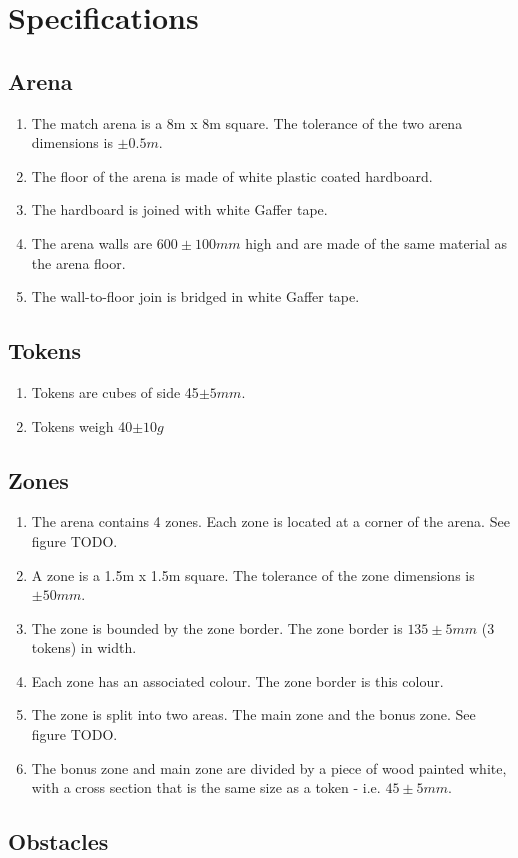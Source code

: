 \section{Specifications}
\newcommand{\rcnii}{\stepcounter{rule}\arabic{subsection}.\arabic{rule}}
\renewcommand{\labelenumi}{\rcn}

\subsection{Arena}
\begin{enumerate}
\item The match arena is a 8m x 8m square.  The tolerance of the two arena dimensions is $\pm0.5m$.
\item The floor of the arena is made of white plastic coated hardboard.
\item The hardboard is joined with white Gaffer tape.
\item The arena walls are $600\pm100mm$ high and are made of the same material as the arena floor.
\item The wall-to-floor join is bridged in white Gaffer tape.
\end{enumerate}

\subsection{Tokens}
\label{tokens}

\begin {enumerate} 
\item Tokens are cubes of side 45$\pm5mm$.
\item Tokens weigh 40$\pm10g$
\end {enumerate}

\subsection{Zones}
\begin {enumerate}
\item The arena contains 4 zones.  Each zone is located at a corner of the arena.  See figure TODO.
\item A zone is a 1.5m x 1.5m square.  The tolerance of the zone dimensions is $\pm50mm$.
\item The zone is bounded by the zone border.  The zone border is $135\pm5mm$ (3 tokens) in width.
\item Each zone has an associated colour.  The zone border is this colour.
\item The zone is split into two areas.  The main zone and the bonus zone.  See figure TODO.
\item The bonus zone and main zone are divided by a piece of wood painted white, with a cross section that is the same size as a token - i.e. $45\pm5mm$.
\end {enumerate}

\subsection{Obstacles}